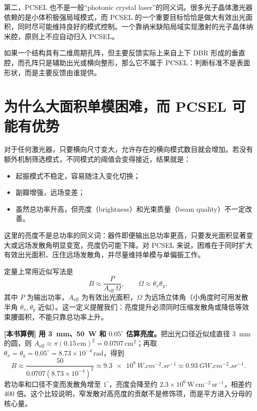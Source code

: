 第二，PCSEL 也不是一般“photonic crystal laser”的同义词。很多光子晶体激光器依赖的是小体积极强局域模式，而 PCSEL 的一个重要目标恰恰是做大有效出光面积，同时尽可能维持良好的模式控制。一个靠纳米缺陷局域实现激射的光子晶体纳米腔，原则上不应自动归入 PCSEL。

如果一个结构具有二维周期孔阵，但主要反馈实际上来自上下 DBR 形成的垂直腔，而孔阵只是辅助出光或横向整形，那么它不属于 PCSEL：判断标准不是表面形状，而是主要反馈由谁提供。

\section{为什么大面积单模困难，而 PCSEL 可能有优势}
对于任何激光器，只要横向尺寸变大，允许存在的横向模式数目就会增加。若没有额外机制筛选模式，不同模式的阈值会变得接近，结果就是：
\begin{itemize}
  \item 起振模式不稳定，容易随注入变化切换；
  \item 副瓣增强，远场变差；
  \item 虽然总功率升高，但亮度（brightness）和光束质量（beam quality）不一定改善。
\end{itemize}

这里的亮度不是总功率的同义词：器件即便输出总功率更高，只要发光面积显著变大或远场发散角明显变宽，亮度仍可能下降。对 PCSEL 来说，困难在于同时扩大有效出光面积、压住远场发散角，并尽量维持单模与单偏振工作。

定量上常用近似写法是
\begin{equation}
B \approx \frac{P}{A_{\mathrm{eff}}\,\Omega},\qquad \Omega\approx \theta_x\theta_y,
\end{equation}
其中 $P$ 为输出功率，$A_{\mathrm{eff}}$ 为有效出光面积，$\Omega$ 为远场立体角（小角度时可用发散半角 $\theta_x,\theta_y$ 近似）。这一定义提醒我们：亮度提升必须同时压缩发散角或降低等效束腰面积，不能只靠总功率上升。

\begin{ExampleBox}
\textbf{[本书算例] 用 \SI{3}{mm}、\SI{50}{W} 和 $0.05^\circ$ 估算亮度。}把出光口径近似成直径 \SI{3}{mm} 的圆，则 $A_{\mathrm{eff}}\approx\pi(0.15\,\mathrm{cm})^2=0.0707\,\mathrm{cm}^2$；再取 $\theta_x=\theta_y=0.05^\circ=8.73\times10^{-4}\,\mathrm{rad}$，得到
\[
B\approx\frac{50}{0.0707(8.73\times10^{-4})^2}
\approx \SI{9.3e8}{W.cm^{-2}.sr^{-1}}
\approx \SI{0.93}{GW.cm^{-2}.sr^{-1}}.
\]
若功率和口径不变而发散角增至 $1^\circ$，亮度会降至约 $2.3\times10^6\,\mathrm{W\,cm^{-2}\,sr^{-1}}$，相差约 400 倍。这个比较说明，窄发散对高亮度的贡献不是修饰项，而是平方进入分母的核心量。
\end{ExampleBox}

